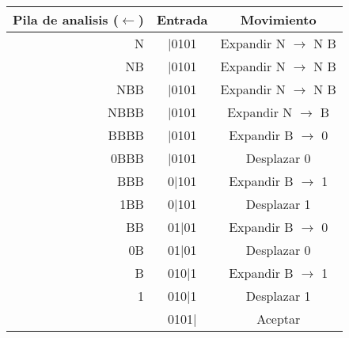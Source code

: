 \documentclass[\main/ApuntesPL.tex]{subfiles}
\begin{document}
    \vspace{5mm}
    \begin{center}
      \begin{tabular}{||r c c||}
        \hline
        Pila de analisis ($\leftarrow$) & Entrada & Movimiento \\ [0.5ex]
        \hline\hline
        N & $\mid$0101 & Expandir N $\rightarrow$ N B\\
        \hline
        NB & $\mid$0101 & Expandir N $\rightarrow$ N B\\
        \hline
        NBB & $\mid$0101 & Expandir N $\rightarrow$ N B\\
        \hline
        NBBB & $\mid$0101 & Expandir N $\rightarrow$ B\\
        \hline
        BBBB & $\mid$0101 & Expandir B $\rightarrow$ 0 \\
        \hline
        0BBB & $\mid$0101 & Desplazar 0\\
        \hline
        BBB & 0$\mid$101 & Expandir B $\rightarrow$ 1\\
        \hline
        1BB & 0$\mid$101 & Desplazar 1\\
        \hline
        BB & 01$\mid$01 & Expandir B $\rightarrow$ 0\\
        \hline
        0B & 01$\mid$01 & Desplazar 0\\
        \hline
        B & 010$\mid$1 & Expandir B $\rightarrow$ 1\\
        \hline
        1 & 010$\mid$1 & Desplazar 1\\
        \hline
        & 0101$\mid$ & Aceptar\\ [1ex]
        \hline
      \end{tabular}
    \end{center}
\end{document}
